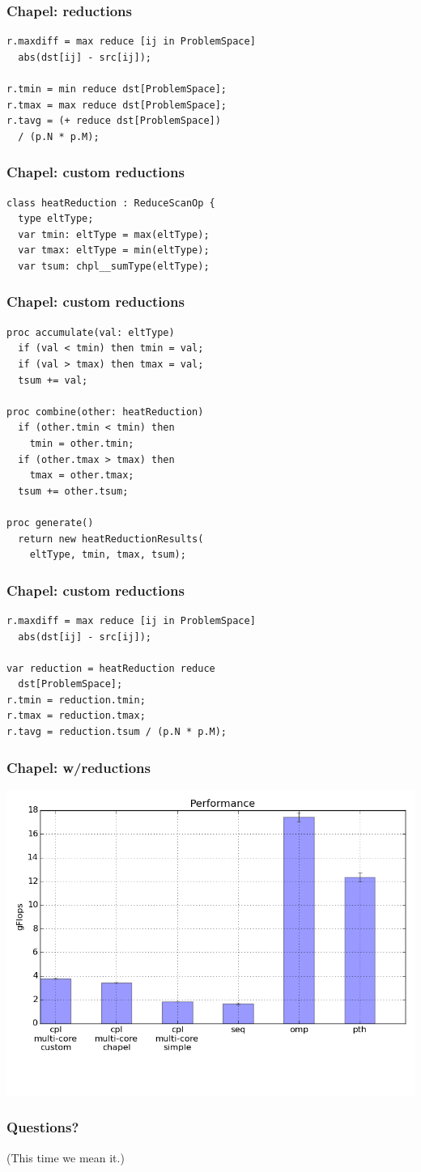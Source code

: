 \documentclass{beamer}
\begin{document}
\begin{frame}[fragile]
 \frametitle{Chapel: reductions}
\begin{verbatim}
r.maxdiff = max reduce [ij in ProblemSpace]
  abs(dst[ij] - src[ij]);

r.tmin = min reduce dst[ProblemSpace];
r.tmax = max reduce dst[ProblemSpace];
r.tavg = (+ reduce dst[ProblemSpace])
  / (p.N * p.M);
\end{verbatim}
\end{frame}

\begin{frame}[fragile]
 \frametitle{Chapel: custom reductions}
\begin{verbatim}
class heatReduction : ReduceScanOp {
  type eltType;
  var tmin: eltType = max(eltType);
  var tmax: eltType = min(eltType);
  var tsum: chpl__sumType(eltType);
\end{verbatim}
\end{frame}

\begin{frame}[fragile]
 \frametitle{Chapel: custom reductions}
\begin{verbatim}
proc accumulate(val: eltType)
  if (val < tmin) then tmin = val;
  if (val > tmax) then tmax = val;
  tsum += val;

proc combine(other: heatReduction)
  if (other.tmin < tmin) then
    tmin = other.tmin;
  if (other.tmax > tmax) then
    tmax = other.tmax;
  tsum += other.tsum;

proc generate()
  return new heatReductionResults(
    eltType, tmin, tmax, tsum);
\end{verbatim}
\end{frame}

\begin{frame}[fragile]
 \frametitle{Chapel: custom reductions}
\begin{verbatim}
r.maxdiff = max reduce [ij in ProblemSpace]
  abs(dst[ij] - src[ij]);

var reduction = heatReduction reduce
  dst[ProblemSpace];
r.tmin = reduction.tmin;
r.tmax = reduction.tmax;
r.tavg = reduction.tsum / (p.N * p.M);
\end{verbatim}
\end{frame}

\begin{frame}
 \frametitle{Chapel: w/reductions}
 \includegraphics[width=\textwidth]{../cpl/report/per_with_reductions.png}
\end{frame}

\begin{frame}
 \frametitle{Questions?}
 (This time we mean it.)
\end{frame}
\end{document}
